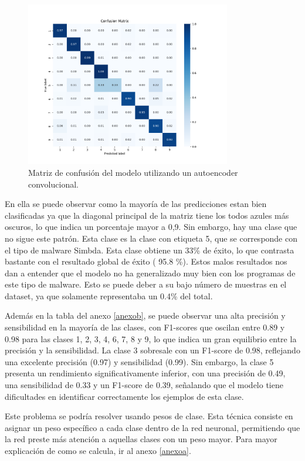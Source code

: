 \begin{figure}[H]
    \centering
    \includegraphics[width=0.8\textwidth]{img/confusionMatrixCAENorm1.png}
    \caption{Matriz de confusión del modelo utilizando un autoencoder convolucional.}
    \label{fig: caeConfusionMatrix}
\end{figure}


En ella se puede observar como la mayoría de las predicciones estan bien clasificadas ya que la diagonal principal de la matriz tiene los todos azules más oscuros, lo que indica un porcentaje mayor a 0,9. Sin embargo, hay una clase que no sigue este patrón. Esta clase es la clase con etiqueta 5, que se corresponde con el tipo de malware Simbda. Esta clase obtiene un 33\% de éxito, lo que contrasta bastante con el resultado global de éxito ( 95.8 \%). Estos malos resultados nos dan a entender que el modelo no ha generalizado muy bien con los programas de este tipo de malware. Esto se puede deber a su bajo número de muestras en el dataset, ya que solamente representaba un 0.4\% del total.
 
Además en la tabla del anexo \ref{anexob}, se puede observar una alta precisión y sensibilidad en la mayoría de las clases, con F1-scores que oscilan entre 0.89 y 0.98 para las clases 1, 2, 3, 4, 6, 7, 8 y 9, lo que indica un gran equilibrio entre la precisión y la sensibilidad. La clase 3 sobresale con un F1-score de 0.98, reflejando una excelente precisión (0.97) y sensibilidad (0.99). Sin embargo, la clase 5 presenta un rendimiento significativamente inferior, con una precisión de 0.49, una sensibilidad de 0.33 y un F1-score de 0.39, señalando que el modelo tiene dificultades en identificar correctamente los ejemplos de esta clase. 

Este problema se podría resolver usando pesos de clase. Esta técnica consiste en asignar un peso específico a cada clase dentro de la red neuronal, permitiendo que la red preste más atención a aquellas clases con un peso mayor. Para mayor explicación de como se calcula, ir al anexo \ref{anexoa}.




